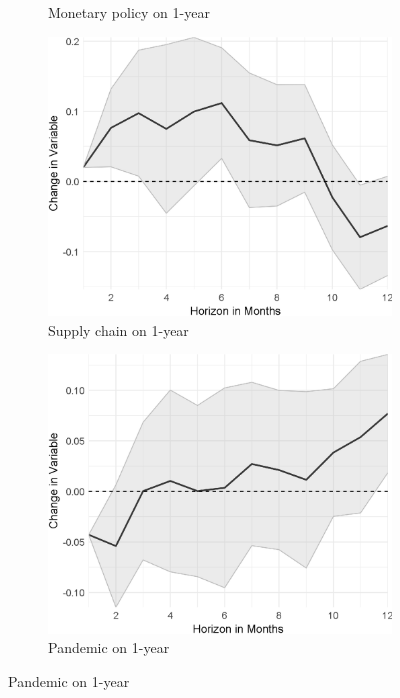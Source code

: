 \begin{figure}[H]
\begin{subfigure}{00.32\textwidth}
		\caption{Monetary policy on 1-year}
	\end{subfigure}
	\begin{subfigure}{00.32\textwidth}
		\includegraphics[width=1\textwidth]{output/lp/baseline/bHP/supply_chain/supply_chainonexpectations1y_djn.eps}
		\caption{Supply chain on 1-year}
	\end{subfigure}
	\begin{subfigure}{00.32\textwidth}
		\includegraphics[width=1\textwidth]{output/lp/baseline/bHP/pandemic/pandemiconexpectations1y_djn.eps}
		\caption{Pandemic on 1-year}
	\end{subfigure}

\end{figure}
